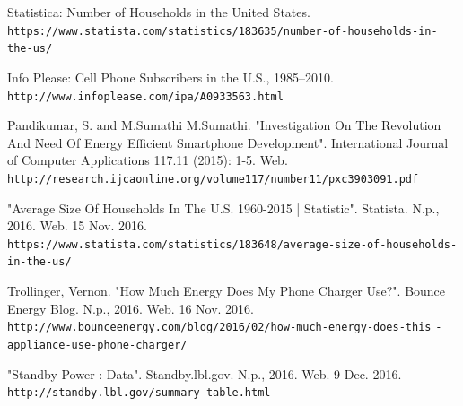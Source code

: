 \documentclass{article}
\begin{document}
\begin{thebibliography}{7}
Statistica: Number of Households in the United States.\\
\texttt{https://www.statista.com/statistics/183635/number-of-households-in-the-us/}

Info Please: Cell Phone Subscribers in the U.S., 1985–2010.
\texttt{http://www.infoplease.com/ipa/A0933563.html}

Pandikumar, S. and M.Sumathi M.Sumathi. "Investigation On The Revolution And Need Of Energy Efficient Smartphone Development". International Journal of Computer Applications 117.11 (2015): 1-5. Web.
\texttt{http://research.ijcaonline.org/volume117/number11/pxc3903091.pdf}

"Average Size Of Households In The U.S. 1960-2015 | Statistic". Statista. N.p., 2016. Web. 15 Nov. 2016.
\texttt{https://www.statista.com/statistics/183648/average-size-of-households-in-the-us/}

Trollinger, Vernon. "How Much Energy Does My Phone Charger Use?". Bounce Energy Blog. N.p., 2016. Web. 16 Nov. 2016.
\texttt{http://www.bounceenergy.com/blog/2016/02/how-much-energy-does-this}
\texttt{-appliance-use-phone-charger/}

"Standby Power : Data". Standby.lbl.gov. N.p., 2016. Web. 9 Dec. 2016.
\texttt{http://standby.lbl.gov/summary-table.html}


\end{thebibliography}
\end{document}
